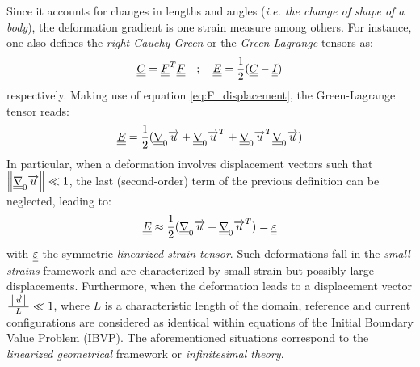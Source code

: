 Since it accounts for changes in lengths and angles (\textit{i.e. the change of shape of a body}), the deformation gradient is one strain measure among others. For instance, one also defines the \textit{right Cauchy-Green} or the \textit{Green-Lagrange} tensors as:
\begin{equation*}
  {\underline{\underline{C}}}={\underline{\underline{F}}}^T{\underline{\underline{F}}} \quad ; \quad {\underline{\underline{E}}}=\frac{1}{2}({\underline{\underline{C}}}-{\underline{\underline{I}}})
\end{equation*}
respectively. Making use of equation \eqref{eq:F_displacement}, the Green-Lagrange tensor reads:
\begin{equation*}
  {\underline{\underline{E}}}=\frac{1}{2}({\underline{\underline{\nabla}}}_0 {\overrightarrow{u}} + {\underline{\underline{\nabla}}}_0 {\overrightarrow{u}}^T + {\underline{\underline{\nabla}}}_0 {\overrightarrow{u}}^T {\underline{\underline{\nabla}}}_0 {\overrightarrow{u}})
\end{equation*}
In particular, when a deformation involves displacement vectors such that $\left\Vert{\underline{\underline{\nabla}}}_0 {\overrightarrow{u}}\right\Vert \ll 1$, the last (second-order) term of the previous definition can be neglected, leading to:
\begin{equation}
  \label{eq:epsilon}
  {\underline{\underline{E}}} \approx \frac{1}{2}({\underline{\underline{\nabla}}}_0 {\overrightarrow{u}} + {\underline{\underline{\nabla}}}_0 {\overrightarrow{u}}^T) = {\underline{\underline{\varepsilon}}}
\end{equation}
with ${\underline{\underline{\varepsilon}}}$ the symmetric \textit{linearized strain tensor}. Such deformations fall in the \textit{small strains} framework and are characterized by small strain but possibly large displacements. Furthermore, when the deformation leads to a displacement vector $\frac{\left\Vert{\overrightarrow{u}}\right\Vert}{L} \ll 1$, where $L$ is a characteristic length of the domain, reference and current configurations are considered as identical within equations of the Initial Boundary Value Problem (IBVP). The aforementioned situations correspond to the \textit{linearized geometrical} framework  or \textit{infinitesimal theory}.

